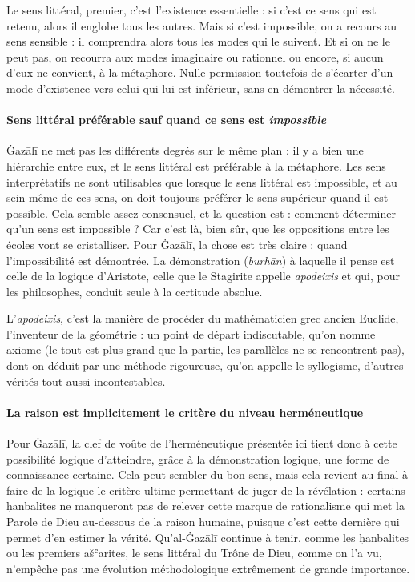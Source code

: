 Le sens littéral, premier, c'est l'existence essentielle : si c'est ce
sens qui est retenu, alors il englobe tous les autres. Mais si c'est
impossible, on a recours au sens sensible : il comprendra alors tous les
modes qui le suivent. Et si on ne le peut pas, on recourra aux modes
imaginaire ou rationnel ou encore, si aucun d'eux
ne convient, à la métaphore. Nulle permission toutefois de s'écarter
d'un mode d'existence vers celui qui
lui est inférieur, sans en démontrer la nécessité.

\paragraph{Sens littéral préférable sauf quand ce sens est \textit{impossible}} Ġazālī ne met pas les différents degrés sur le même plan : il y a bien
une hiérarchie entre eux, et le sens littéral est préférable à la
métaphore. Les sens interprétatifs ne sont utilisables que lorsque le
sens littéral est impossible, et au sein même de ces sens, on doit
toujours préférer le sens supérieur quand il est possible. Cela semble
assez consensuel, et la question est : comment déterminer qu'un sens est
impossible ? Car c'est là, bien sûr, que les oppositions entre les
écoles vont se cristalliser. Pour Ġazālī, la chose est très claire :
quand l'impossibilité est démontrée. La démonstration (\emph{burhān}) à
laquelle il pense est celle de la logique d'Aristote, celle que le
Stagirite appelle \emph{apodeixis} et qui, pour les philosophes, conduit
seule à la certitude absolue. 
\begin{Def}[apodeixis]
L'\emph{apodeixis}, c'est la manière de
procéder du mathématicien grec ancien Euclide, l'inventeur de la
géométrie : un point de départ indiscutable, qu'on nomme axiome (le tout
est plus grand que la partie, les parallèles ne se rencontrent pas),
dont on déduit par une méthode rigoureuse, qu'on appelle le syllogisme,
d'autres vérités tout aussi incontestables.
\end{Def}


\paragraph{La raison est implicitement le critère du niveau herméneutique}Pour Ġazālī, la clef de voûte de l'herméneutique présentée ici tient
donc à cette possibilité logique d'atteindre, grâce à la démonstration
logique, une forme de connaissance certaine. Cela peut sembler du bon
sens, mais cela revient au final à faire de la logique le critère ultime
permettant de juger de la révélation : certains ḥanbalites ne manqueront
pas de relever cette marque de rationalisme qui met la Parole de Dieu
au-dessous de la raison humaine, puisque c'est cette dernière qui permet
d'en estimer la vérité. Qu'al-Ġazālī continue à tenir, comme les
ḥanbalites ou les premiers ašʿarites, le sens littéral du Trône de Dieu,
comme on l'a vu, n'empêche pas une évolution méthodologique extrêmement
de grande importance.

